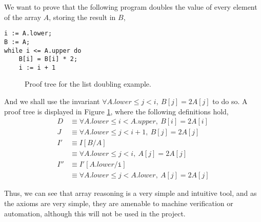 \begin{example}
  \label{exmpl:heap-double}

  We want to prove that the following program doubles the value of
  every element of the array $A$, storing the result in $B$,
\pagebreak
\begin{lstlisting}
i := A.lower;
B := A;
while i <= A.upper do
    B[i] = B[i] * 2;
    i := i + 1
\end{lstlisting}

  \begin{figure}[t]
    \centering
    \begin{prooftree}




    \end{prooftree}
    \caption{Proof tree for the list doubling example.}
    \label{fig:exmpl:heap-double-tree}
  \end{figure}

  And we shall use the invariant $\forall A.lower \leq j < i,\ B[j]
  = 2 A[j]$ to do so. A proof tree is displayed in Figure
  \ref{fig:exmpl:heap-double-tree}, where the following definitions hold,
  \begin{align*}
    D &\equiv \forall A.lower \leq i < A.upper,\ B[i] = 2 A[i]\\
    J &\equiv \forall A.lower \leq j < i + 1,\ B[j] = 2 A[j]\\
    I' &\equiv I[B/A]\\
    &\equiv \forall A.lower \leq j < i,\ A[j] = 2 A[j]\\
    I'' &\equiv I'[A.lower/\mathtt{i}]\\
    &\equiv \forall A.lower \leq j < A.lower,\ A[j] = 2 A[j]
  \end{align*}
\end{example}

Thus, we can see that array reasoning is a very simple and intuitive
tool, and as the axioms are very simple, they are amenable to machine
verification or automation, although this will not be used in the project.

